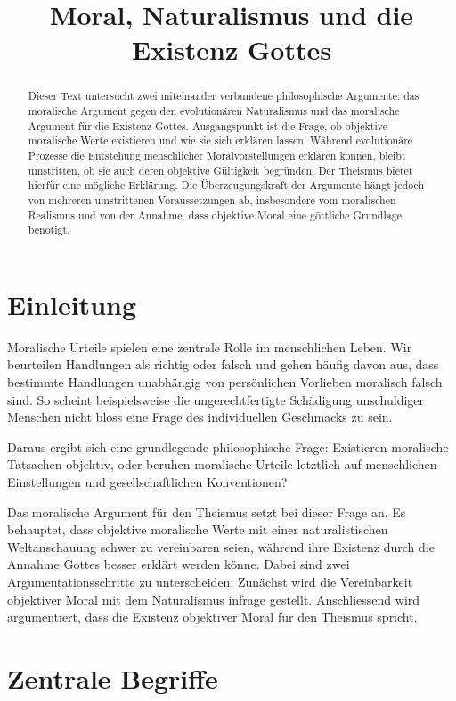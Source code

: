 \documentclass[11pt,a4paper]{article}
\title{Moral, Naturalismus und die Existenz Gottes}
\author{}
\date{}
\begin{document}
	\maketitle
	
	\begin{abstract}
		Dieser Text untersucht zwei miteinander verbundene philosophische Argumente: das moralische Argument gegen den evolutionären Naturalismus und das moralische Argument für die Existenz Gottes. Ausgangspunkt ist die Frage, ob objektive moralische Werte existieren und wie sie sich erklären lassen. Während evolutionäre Prozesse die Entstehung menschlicher Moralvorstellungen erklären können, bleibt umstritten, ob sie auch deren objektive Gültigkeit begründen. Der Theismus bietet hierfür eine mögliche Erklärung. Die Überzeugungskraft der Argumente hängt jedoch von mehreren umstrittenen Voraussetzungen ab, insbesondere vom moralischen Realismus und von der Annahme, dass objektive Moral eine göttliche Grundlage benötigt.
	\end{abstract}
	
	\section{Einleitung}
	
	Moralische Urteile spielen eine zentrale Rolle im menschlichen Leben. Wir beurteilen Handlungen als richtig oder falsch und gehen häufig davon aus, dass bestimmte Handlungen unabhängig von persönlichen Vorlieben moralisch falsch sind. So scheint beispielsweise die ungerechtfertigte Schädigung unschuldiger Menschen nicht bloss eine Frage des individuellen Geschmacks zu sein.
	
	Daraus ergibt sich eine grundlegende philosophische Frage: Existieren moralische Tatsachen objektiv, oder beruhen moralische Urteile letztlich auf menschlichen Einstellungen und gesellschaftlichen Konventionen?
	
	Das moralische Argument für den Theismus setzt bei dieser Frage an. Es behauptet, dass objektive moralische Werte mit einer naturalistischen Weltanschauung schwer zu vereinbaren seien, während ihre Existenz durch die Annahme Gottes besser erklärt werden könne. Dabei sind zwei Argumentationsschritte zu unterscheiden: Zunächst wird die Vereinbarkeit objektiver Moral mit dem Naturalismus infrage gestellt. Anschliessend wird argumentiert, dass die Existenz objektiver Moral für den Theismus spricht.
	
	\section{Zentrale Begriffe}
	
\end{document}
